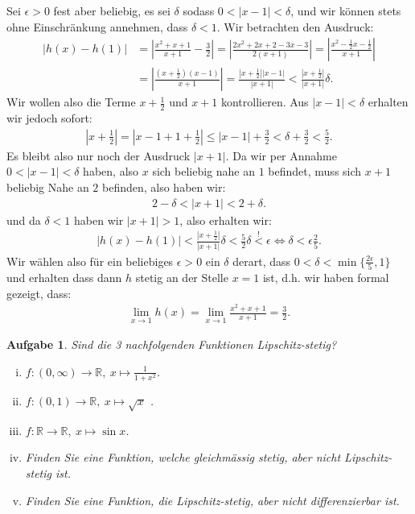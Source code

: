 \documentclass[a4paper, 20]{exam}
\newtheorem{ex}{Aufgabe}
\begin{document}
\begin{solution}
Sei $ \epsilon >0$ fest aber beliebig, es sei $\delta$ sodass $0< |x-1| < \delta$, und wir können stets ohne Einschränkung annehmen, dass $\delta < 1$. Wir betrachten den Ausdruck:
\begin{align*}
|h(x)-h(1)| &= \left| \frac{x^2 + x +1}{x+1} - \frac{3}{2} \right| = \left| \frac{2x^2+2x+2-3x-3}{2(x+1)} \right| = \left| \frac{x^2- \frac{1}{2}x- \frac{1}{2}}{x+1} \right| \\
& = \left| \frac{ \left( x + \frac{1}{2}\right) (x-1)}{x+1} \right| = \frac{ \left| x + \frac{1}{2}\right| |x-1|}{|x+1|} < \frac{\left|x + \frac{1}{2} \right|}{|x+1|} \delta.
\end{align*}
Wir wollen also die Terme $x+ \frac{1}{2}$ und $x+1$ kontrollieren. Aus $|x-1| < \delta$ erhalten wir jedoch sofort:
\begin{align*}
\left| x + \frac{1}{2} \right| = \left| x -1 +1 + \frac{1}{2} \right| \leq |x-1| + \frac{3}{2} < \delta + \frac{3}{2}< \frac{5}{2}.
\end{align*}
Es bleibt also nur noch der Ausdruck $|x+1|$. Da wir per Annahme $0 < |x-1| < \delta$ haben,  also $x$ sich beliebig nahe an $1$ befindet, muss sich $x+1$ beliebig Nahe an $2$ befinden, also haben wir:
\begin{align*}
2 -\delta < |x+1| < 2 + \delta.
\end{align*}
und da $\delta <1$ haben wir $|x+1| >1$, also erhalten wir:
\begin{align*}
|h(x)-h(1)| < \frac{\left| x + \frac{1}{2} \right|}{|x+1|} \delta < \frac{5}{2} \delta \overset{!}< \epsilon \iff \delta < \epsilon \frac{2}{5}.
\end{align*} 
Wir wählen also für ein beliebiges $\epsilon >0$ ein $\delta$ derart, dass $0 < \delta < \min \lbrace \frac{2\epsilon}{5},1 \rbrace$ und erhalten dass dann $h$ stetig an der Stelle $x=1$ ist, d.h. wir haben formal gezeigt, dass:
\begin{align*}
\lim_{x \rightarrow 1} h(x) = \lim_{x \rightarrow 1} \frac{x^2 + x+1}{x+1} = \frac{3}{2}.
\end{align*}
\end{solution}


\begin{ex} Sind die 3 nachfolgenden Funktionen Lipschitz-stetig?
\begin{enumerate}[i)]
\item $f:(0, \infty) \longrightarrow \mathbb{R}, \ x \longmapsto \frac{1}{1+x^2}$.
\item $f:(0,1) \longrightarrow \mathbb{R}, \ x \longmapsto \sqrt{x}$ .
\item $f: \mathbb{R} \longrightarrow \mathbb{R}, \ x \longmapsto \sin x$.
\item Finden Sie eine Funktion, welche gleichmässig stetig, aber nicht Lipschitz-stetig ist.
\item Finden Sie eine Funktion, die Lipschitz-stetig, aber nicht differenzierbar ist.

\end{enumerate}

\end{ex}
\end{document}
